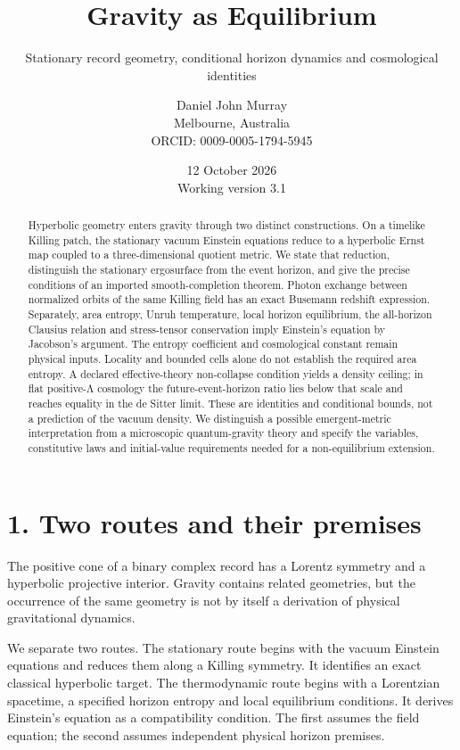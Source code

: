 \documentclass[
  11pt,
  a4paper,
]{article}
\title{Gravity as Equilibrium}
\subtitle{Stationary record geometry, conditional horizon dynamics and cosmological identities}
\author{Daniel John Murray\\{\small Melbourne, Australia}\\{\small ORCID: 0009-0005-1794-5945}}
\date{12 October 2026\\{\small Working version 3.1}}
\begin{document}
\maketitle
\begin{abstract}
Hyperbolic geometry enters gravity through two distinct constructions. On a timelike Killing patch, the stationary vacuum Einstein equations reduce to a hyperbolic Ernst map coupled to a three-dimensional quotient metric. We state that reduction, distinguish the stationary ergosurface from the event horizon, and give the precise conditions of an imported smooth-completion theorem. Photon exchange between normalized orbits of the same Killing field has an exact Busemann redshift expression. Separately, area entropy, Unruh temperature, local horizon equilibrium, the all-horizon Clausius relation and stress-tensor conservation imply Einstein's equation by Jacobson's argument. The entropy coefficient and cosmological constant remain physical inputs. Locality and bounded cells alone do not establish the required area entropy. A declared effective-theory non-collapse condition yields a density ceiling; in flat positive-Λ cosmology the future-event-horizon ratio lies below that scale and reaches equality in the de Sitter limit. These are identities and conditional bounds, not a prediction of the vacuum density. We distinguish a possible emergent-metric interpretation from a microscopic quantum-gravity theory and specify the variables, constitutive laws and initial-value requirements needed for a non-equilibrium extension.
\end{abstract}

\section{1. Two routes and their premises}\label{two-routes-and-their-premises}

The positive cone of a binary complex record has a Lorentz symmetry and a hyperbolic projective interior. Gravity contains related geometries, but the occurrence of the same geometry is not by itself a derivation of physical gravitational dynamics.

We separate two routes. The stationary route begins with the vacuum Einstein equations and reduces them along a Killing symmetry. It identifies an exact classical hyperbolic target. The thermodynamic route begins with a Lorentzian spacetime, a specified horizon entropy and local equilibrium conditions. It derives Einstein's equation as a compatibility condition. The first assumes the field equation; the second assumes independent physical horizon premises.
\end{document}
